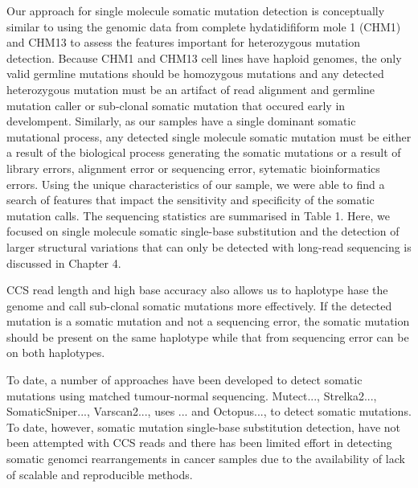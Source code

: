 Our approach for single molecule somatic mutation detection is conceptually similar to using the genomic data from complete hydatidifiform mole 1 (CHM1) and CHM13 to assess the features important for heterozygous mutation detection. Because CHM1 and CHM13 cell lines have haploid genomes, the only valid germline mutations should be homozygous mutations and any detected heterozygous mutation must be an artifact of read alignment and germline mutation caller or sub-clonal somatic mutation that occured early in develompent. Similarly, as our samples have a single dominant somatic mutational process, any detected single molecule somatic mutation must be either a result of the biological process generating the somatic mutations or a result of library errors, alignment error or sequencing error, sytematic bioinformatics errors. Using the unique characteristics of our sample, we were able to find a search of features that impact the sensitivity and specificity of the somatic mutation calls. The sequencing statistics are summarised in Table 1. Here, we focused on single molecule somatic single-base substitution and the detection of larger structural variations that can only be detected with long-read sequencing is discussed in Chapter 4.

CCS read length and high base accuracy also allows us to haplotype hase the genome and call sub-clonal somatic mutations more effectively. If the detected mutation is a somatic mutation and not a sequencing error, the somatic mutation should be present on the same haplotype while that from sequencing error can be on both haplotypes. 

To date, a number of approaches have been developed to detect somatic mutations using matched tumour-normal sequencing. Mutect..., Strelka2..., SomaticSniper..., Varscan2..., uses ... and Octopus..., to detect somatic mutations. To date, however, somatic mutation single-base substitution detection, have not been attempted with CCS reads and there has been limited effort in detecting somatic genomci rearrangements in cancer samples due to the availability of lack of scalable and reproducible methods. 




